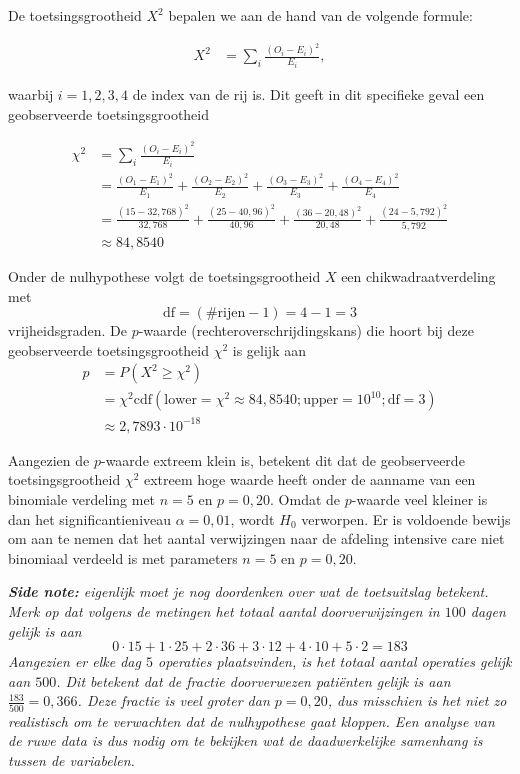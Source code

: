 {    De toetsingsgrootheid $X^2$ bepalen we aan de hand van de volgende formule:

    \begin{align*}
        X^2  &= \sum_{i} \frac{(O_{i} - E_{i})^2}{E_{i}},
    \end{align*}

    waarbij $i = 1,2,3,4$ de index van de rij is.
    Dit geeft in dit specifieke geval een geobserveerde toetsingsgrootheid 
    
    \begin{align*}
        \chi^2  &= \sum_{i} \frac{(O_{i} - E_{i})^2}{E_{i}} \\
                &=\frac{(O_{1} - E_{1})^2}{E_{1}} + \frac{(O_{2} - E_{2})^2}{E_{2}} + \frac{(O_{3} - E_{3})^2}{E_{3}} + \frac{(O_{4} - E_{4})^2}{E_{4}} \\
                &= \frac{(15 - 32,768)^2}{32,768} + \frac{(25-40,96)^2}{40,96} + \frac{(36-20,48)^2}{20,48} + \frac{(24-5,792)^2}{5,792} \\
                &\approx 84,8540
    \end{align*}

    Onder de nulhypothese volgt de toetsingsgrootheid $X$ een chikwadraatverdeling met
    \[
        \text{df} = (\#\text{rijen}-1) = 4 - 1 = 3
    \]
    vrijheidsgraden.
    De $p$-waarde (rechteroverschrijdingskans) die hoort bij deze geobserveerde toetsingsgrootheid $\chi^2$ is gelijk aan
    \begin{align*}
        p   &= P(X^2 \ge \chi^2) \\
            &= \chi^2\text{cdf}(\text{lower}=\chi^2\approx 84,8540; \text{upper}=10^{10}; \text{df}=3) \\
            &\approx 2,7893 \cdot 10^{-18}
    \end{align*}

    Aangezien de $p$-waarde extreem klein is, betekent dit dat de geobserveerde toetsingsgrootheid $\chi^2$ extreem hoge waarde heeft onder de aanname van een binomiale verdeling met $n=5$ en $p=0,20$.
    Omdat de $p$-waarde veel kleiner is dan het significantieniveau $\alpha=0,01$, wordt $H_0$  verworpen.
    Er is voldoende bewijs om aan te nemen dat het aantal verwijzingen naar de afdeling intensive care niet binomiaal verdeeld is met parameters $n=5$ en $p=0,20$.
        
    \vspace{1em}

    {
        \itshape \textbf{Side note:} 
        eigenlijk moet je nog doordenken over wat de toetsuitslag betekent.
        Merk op dat volgens de metingen het totaal aantal doorverwijzingen in $100$ dagen gelijk is aan
        \[
            0\cdot 15 + 1 \cdot 25 + 2 \cdot 36 + 3 \cdot 12 + 4 \cdot 10 + 5 \cdot 2 = 183
        \]
        Aangezien er elke dag $5$ operaties plaatsvinden, is het totaal aantal operaties gelijk aan $500$.
        Dit betekent dat de fractie doorverwezen pati\"enten gelijk is aan $\frac{183}{500} = 0,366$.
        Deze fractie is veel groter dan $p=0,20$, dus misschien is het niet zo realistisch om te verwachten dat de nulhypothese gaat kloppen.
        Een analyse van de ruwe data is dus nodig om te bekijken wat de daadwerkelijke samenhang is tussen de variabelen.
    }
}
